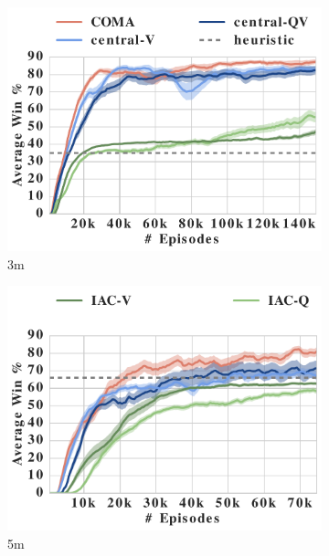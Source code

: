 \documentclass[letterpaper]{article}
\begin{document}
 \begin{figure}[t!]
 	\centering
 	\begin{subfigure}[b]{0.4\linewidth}
% 		
 		\includegraphics[width=\textwidth]{shared/3m_ef}
 		\caption{3m}
 	\end{subfigure}
  	\begin{subfigure}[b]{0.4\linewidth}
	\includegraphics[width=\textwidth]{shared/5m_ef}
 	\caption{5m}
 	\end{subfigure}
 	\begin{subfigure}[b]{0.4\linewidth}

\end{subfigure}
\end{figure}
\end{document}
